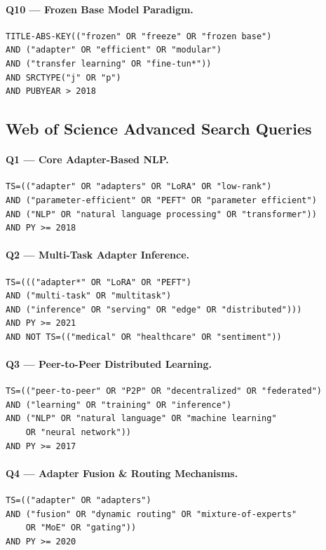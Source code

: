 \paragraph{Q10 — Frozen Base Model Paradigm.}
\begin{verbatim}
TITLE-ABS-KEY(("frozen" OR "freeze" OR "frozen base")
AND ("adapter" OR "efficient" OR "modular")
AND ("transfer learning" OR "fine-tun*"))
AND SRCTYPE("j" OR "p")
AND PUBYEAR > 2018
\end{verbatim}

\subsection*{Web of Science Advanced Search Queries}
\label{app:db_queries:wos}

\paragraph{Q1 — Core Adapter-Based NLP.}
\begin{verbatim}
TS=(("adapter" OR "adapters" OR "LoRA" OR "low-rank")
AND ("parameter-efficient" OR "PEFT" OR "parameter efficient")
AND ("NLP" OR "natural language processing" OR "transformer"))
AND PY >= 2018
\end{verbatim}

\paragraph{Q2 — Multi-Task Adapter Inference.}
\begin{verbatim}
TS=((("adapter*" OR "LoRA" OR "PEFT")
AND ("multi-task" OR "multitask")
AND ("inference" OR "serving" OR "edge" OR "distributed")))
AND PY >= 2021
AND NOT TS=(("medical" OR "healthcare" OR "sentiment"))
\end{verbatim}

\paragraph{Q3 — Peer-to-Peer Distributed Learning.}
\begin{verbatim}
TS=(("peer-to-peer" OR "P2P" OR "decentralized" OR "federated")
AND ("learning" OR "training" OR "inference")
AND ("NLP" OR "natural language" OR "machine learning"
    OR "neural network"))
AND PY >= 2017
\end{verbatim}

\paragraph{Q4 — Adapter Fusion \& Routing Mechanisms.}
\begin{verbatim}
TS=(("adapter" OR "adapters")
AND ("fusion" OR "dynamic routing" OR "mixture-of-experts"
    OR "MoE" OR "gating"))
AND PY >= 2020
\end{verbatim}

